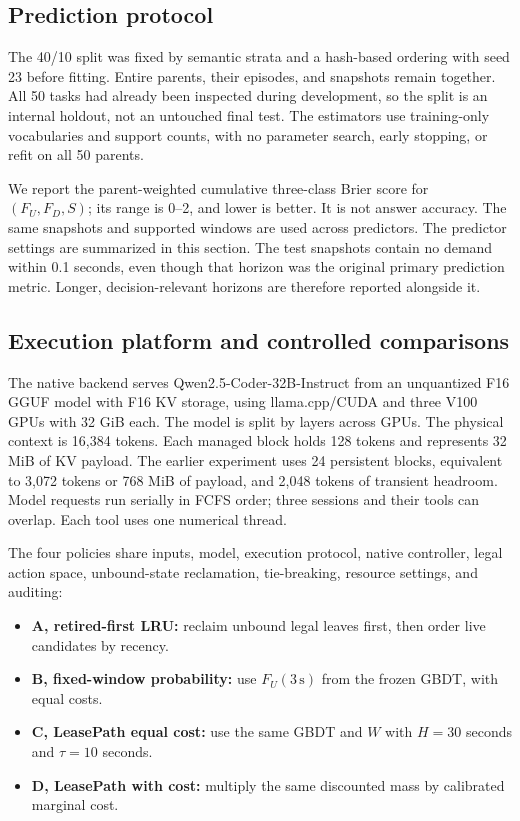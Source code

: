 \documentclass[sigconf, screen, review]{acmart}
\providecommand{\tightlist}{\setlength{\itemsep}{0pt}\setlength{\parskip}{0pt}}
\begin{document}
\subsection{Prediction protocol}\label{prediction-protocol}

The 40/10 split was fixed by semantic strata and a hash-based ordering
with seed 23 before fitting. Entire parents, their episodes, and
snapshots remain together. All 50 tasks had already been inspected
during development, so the split is an internal holdout, not an
untouched final test. The estimators use training-only vocabularies and
support counts, with no parameter search, early stopping, or refit on
all 50 parents.

We report the parent-weighted cumulative three-class Brier score for
\((F_U,F_D,S)\); its range is 0--2, and lower is better. It is not
answer accuracy. The same snapshots and supported windows are used
across predictors. The predictor settings are summarized in this section.
The test snapshots contain no demand within 0.1 seconds, even though
that horizon was the original primary prediction metric. Longer,
decision-relevant horizons are therefore reported alongside it.

\subsection{Execution platform and controlled
comparisons}\label{execution-platform-and-controlled-comparisons}

The native backend serves Qwen2.5-Coder-32B-Instruct from an unquantized
F16 GGUF model with F16 KV storage, using llama.cpp/CUDA and three V100
GPUs with 32 GiB each. The model is split by layers across GPUs. The
physical context is 16,384 tokens. Each managed block holds 128 tokens
and represents 32 MiB of KV payload. The earlier experiment uses 24
persistent blocks, equivalent to 3,072 tokens or 768 MiB of payload, and
2,048 tokens of transient headroom. Model requests run serially in FCFS
order; three sessions and their tools can overlap. Each tool uses one
numerical thread.

The four policies share inputs, model, execution protocol, native
controller, legal action space, unbound-state reclamation, tie-breaking,
resource settings, and auditing:

\begin{itemize}
\tightlist
\item
  \textbf{A, retired-first LRU:} reclaim unbound legal leaves first,
  then order live candidates by recency.
\item
  \textbf{B, fixed-window probability:} use \(F_U(3\,\mathrm{s})\) from
  the frozen GBDT, with equal costs.
\item
  \textbf{C, LeasePath equal cost:} use the same GBDT and \(W\) with
  \(H=30\) seconds and \(\tau=10\) seconds.
\item
  \textbf{D, LeasePath with cost:} multiply the same discounted mass by
  calibrated marginal cost.
\end{itemize}
\end{document}
